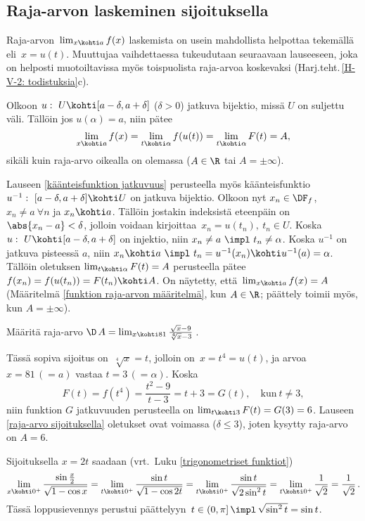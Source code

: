 \subsection*{Raja-arvon laskeminen sijoituksella}

Raja-arvon $\,\lim_{x \kohti a} f(x)$ laskemista on usein mahdollista helpottaa tekemällä
 eli  $\,x=u(t)$. Muuttujaa vaihdettaessa tukeudutaan
seuraavaan lauseeseen, joka on helposti muotoiltavissa myös toispuolista raja-arvoa
koskevaksi (Harj.teht.\,\ref{H-V-2: todistuksia}c).
\begin{Lause} \label{raja-arvo sijoituksella} Olkoon $u:\ U\kohti[a-\delta,a+\delta]$ 
($\delta>0$) jatkuva bijektio, missä $U$ on suljettu väli. Tällöin jos $u(\alpha)=a$, niin
pätee
\[
\lim_{x \kohti a} f(x) = \lim_{t\kohti\alpha} f(u(t)) = \lim_{t\kohti\alpha} F(t)=A,
\]
sikäli kuin raja-arvo oikealla on olemassa ($A\in\R$ tai $A=\pm\infty$).
\end{Lause}
\tod Lauseen \ref{käänteisfunktion jatkuvuus} perusteella myös käänteisfunktio
$u^{-1}:\ [a-\delta,a+\delta] \kohti U$ on jatkuva bijektio. Olkoon nyt $x_n\in\DF_f$,
$x_n \neq a\ \forall n$ ja $x_n \kohti a$. Tällöin jostakin indeksistä eteenpäin on 
$\abs{x_n-a}<\delta$, jolloin voidaan kirjoittaa $\,x_n=u(t_n),\ t_n \in U$. Koska
$u:\ U \kohti [a-\delta,a+\delta]$ on injektio, niin $x_n \neq a\ \impl\ t_n\neq\alpha$.
Koska $u^{-1}$ on jatkuva pisteessä $a$, niin 
$x_n \kohti a\ \impl\ t_n=u^{-1}(x_n) \kohti u^{-1}(a)=\alpha$. Tällöin oletuksen
$\lim_{t\kohti\alpha} F(t)=A$ perusteella pätee $f(x_n)=f(u(t_n))=F(t_n) \kohti A$. On näytetty,
että $\,\lim_{x \kohti a} f(x)=A$ (Määritelmä \ref{funktion raja-arvon määritelmä},
kun $A\in\R$; päättely toimii myös, kun $A=\pm\infty$). \loppu

\begin{Exa} \label{raja-arvo muuttujan vaihdolla} Määritä raja-arvo
$\D \,A=\lim_{x \kohti 81} \frac{\sqrt{x}-9}{\sqrt[4]{x}-3}\,$.
\end{Exa}
\ratk Tässä sopiva sijoitus on $\,\sqrt[4]{x}=t$, jolloin on $\,x=t^4=u(t)$, ja arvoa
$x=81\,(=a)$ vastaa $t=3\,(=\alpha)$. Koska
\[
F(t)=f(t^4)=\frac{t^2-9}{t-3}=t+3=G(t), \quad \text{kun}\ t \neq 3,
\]
niin funktion $G$ jatkuvuuden perusteella on $\lim_{t \kohti 3} F(t)=G(3)=6$. Lauseen
\ref{raja-arvo sijoituksella} oletukset ovat voimassa ($\delta \le 3$), joten kysytty
raja-arvo on $A=6$. \loppu
\begin{Exa} Sijoituksella $x=2t$ saadaan (vrt.\ Luku \ref{trigonometriset funktiot})
\[
\lim_{x \kohti 0^+} \frac{\sin\frac{x}{2}}{\sqrt{1-\cos x}}
  = \lim_{t \kohti 0^+} \frac{\sin t}{\sqrt{1-\cos 2t}}
  = \lim_{t \kohti 0^+} \frac{\sin t}{\sqrt{2\sin^2 t}}
  = \lim_{t \kohti 0^+} \frac{1}{\sqrt{2}} 
  = \frac{1}{\sqrt{2}}\,.
\]
Tässä loppusievennys perustui päättelyyn
$\,t\in(0,\pi]\,\impl\,\sqrt{\sin^2 t}=\sin t$. \loppu
\end{Exa}

